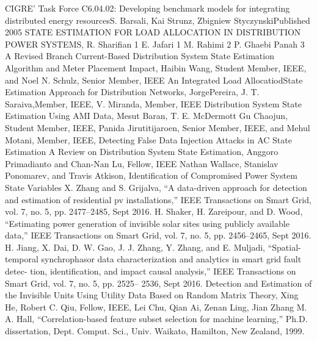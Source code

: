 \begin{thebibliography}{00}
   CIGRE' Task Force C6.04.02: Developing benchmark models for integrating distributed energy resourcesS. Barsali, Kai Strunz, Zbigniew StyczynskiPublished 2005
   STATE ESTIMATION FOR LOAD ALLOCATION IN DISTRIBUTION POWER SYSTEMS, R. Sharifian 1 E. Jafari 1 M. Rahimi 2 P. Ghaebi Panah 3
   A Revised Branch Current-Based Distribution System State Estimation Algorithm and Meter Placement Impact, Haibin Wang, Student Member, IEEE, and Noel N. Schulz, Senior Member, IEEE
   An Integrated Load AllocatiodState Estimation Approach for Distribution Networks, JorgePereira, J. T. Saraiva,Member, IEEE, V. Miranda, Member, IEEE
   Distribution System State Estimation Using AMI Data, Mesut Baran, T. E. McDermott
   Gu Chaojun, Student Member, IEEE, Panida Jirutitijaroen, Senior Member, IEEE, and Mehul Motani, Member, IEEE, Detecting False Data Injection Attacks in AC State Estimation
   A Review on Distribution System State Estimation, Anggoro Primadianto and Chan-Nan Lu, Fellow, IEEE
   Nathan Wallace, Stanislav Ponomarev, and Travis Atkison, Identification of Compromised Power System State Variables
   X. Zhang and S. Grijalva, “A data-driven approach for detection and estimation of residential pv installations,” IEEE Transactions on Smart Grid, vol. 7, no. 5, pp. 2477–2485, Sept 2016.
   H. Shaker, H. Zareipour, and D. Wood, “Estimating power generation of invisible solar sites using publicly available data,” IEEE Transactions on Smart Grid, vol. 7, no. 5, pp. 2456–2465, Sept 2016.
   H. Jiang, X. Dai, D. W. Gao, J. J. Zhang, Y. Zhang, and E. Muljadi, “Spatial-temporal synchrophasor data characterization and analytics in smart grid fault detec- tion, identification, and impact causal analysis,” IEEE Transactions on Smart Grid, vol. 7, no. 5, pp. 2525– 2536, Sept 2016.
   Detection and Estimation of the Invisible Units Using Utility Data Based on Random Matrix Theory, Xing He, Robert C. Qiu, Fellow, IEEE, Lei Chu, Qian Ai, Zenan Ling, Jian Zhang
   M. A. Hall, “Correlation-based feature subset selection for machine learning,” Ph.D. dissertation, Dept. Comput. Sci., Univ. Waikato, Hamilton, New Zealand, 1999.

\end{thebibliography}
